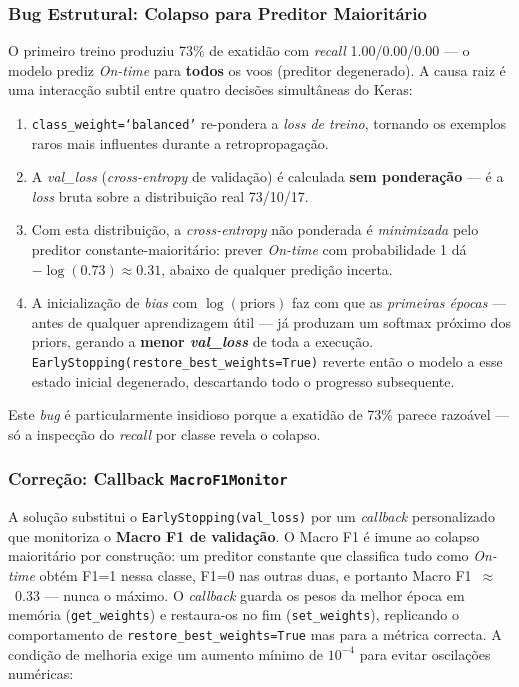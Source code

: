 \documentclass[conference]{IEEEtran}
\begin{document}
\subsubsection{Bug Estrutural: Colapso para Preditor Maioritário}
O primeiro treino produziu 73\% de exatidão com \textit{recall}
1.00/0.00/0.00 — o modelo prediz \textit{On-time} para \textbf{todos} os voos
(preditor degenerado). A causa raiz é uma interacção subtil entre quatro
decisões simultâneas do Keras:
\begin{enumerate}
\item \texttt{class\_weight=`balanced'} re-pondera a \textit{loss de treino},
      tornando os exemplos raros mais influentes durante a retropropagação.
\item A \textit{val\_loss} (\textit{cross-entropy} de validação) é calculada
      \textbf{sem ponderação} — é a \textit{loss} bruta sobre a distribuição real
      73/10/17.
\item Com esta distribuição, a \textit{cross-entropy} não ponderada é
      \emph{minimizada} pelo preditor constante-maioritário: prever
      \textit{On-time} com probabilidade 1 dá $-\log(0.73) \approx 0.31$, abaixo
      de qualquer predição incerta.
\item A inicialização de \textit{bias} com $\log(\text{priors})$ faz com que as
      \emph{primeiras épocas} — antes de qualquer aprendizagem útil — já produzam
      um softmax próximo dos priors, gerando a \textbf{menor \textit{val\_loss}}
      de toda a execução. \texttt{EarlyStopping(restore\_best\_weights=True)}
      reverte então o modelo a esse estado inicial degenerado, descartando todo
      o progresso subsequente.
\end{enumerate}
Este \textit{bug} é particularmente insidioso porque a exatidão de 73\% parece
razoável — só a inspecção do \textit{recall} por classe revela o colapso.

\subsubsection{Correção: Callback \texttt{MacroF1Monitor}}
A solução substitui o \texttt{EarlyStopping(val\_loss)} por um \textit{callback}
personalizado que monitoriza o \textbf{Macro F1 de validação}. O Macro F1 é
imune ao colapso maioritário por construção: um preditor constante que classifica
tudo como \textit{On-time} obtém F1=1 nessa classe, F1=0 nas outras duas, e
portanto Macro F1~$\approx$~0.33 — nunca o máximo. O \textit{callback} guarda os
pesos da melhor época em memória (\texttt{get\_weights}) e restaura-os no fim
(\texttt{set\_weights}), replicando o comportamento de
\texttt{restore\_best\_weights=True} mas para a métrica correcta. A condição de
melhoria exige um aumento mínimo de $10^{-4}$ para evitar oscilações numéricas:
\end{document}
